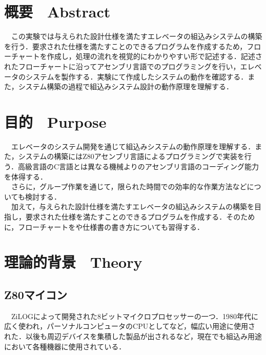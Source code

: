 



\fontsize{11.041pt}{16.562pt}\selectfont


\section{概要　Abstract}
　この実験では与えられた設計仕様を満たすエレベータの組込みシステムの構築を行う．要求された仕様を満たすことのできるプログラムを作成するため，フローチャートを作成し，処理の流れを視覚的にわかりやすい形で記述する．記述されたフローチャートに沿ってアセンブリ言語でのプログラミングを行い，エレベータのシステムを製作する．実験にて作成したシステムの動作を確認する．また，システム構築の過程で組込みシステム設計の動作原理を理解する．


\section{目的　Purpose}
　エレベータのシステム開発を通じて組込みシステムの動作原理を理解する．また，システムの構築にはZ80アセンブリ言語によるプログラミングで実装を行う．高級言語のC言語とは異なる機械よりのアセンブリ言語のコーディング能力を体得する．\\
　さらに，グループ作業を通じて，限られた時間での効率的な作業方法などについても検討する．\\
　加えて，与えられた設計仕様を満たすエレベータの組込みシステムの構築を目指し，要求された仕様を満たすことのできるプログラムを作成する．そのために，フローチャートをや仕様書の書き方についても習得する．


\section{理論的背景　Theory}
\subsection{Z80マイコン}
　ZiLOGによって開発された8ビットマイクロプロセッサーの一つ．1980年代に広く使われ，パーソナルコンピュータのCPUとしてなど，幅広い用途に使用された．以後も周辺デバイスを集積した製品が出されるなど，現在でも組込み用途において各種機器に使用されている．\cite{z80}

